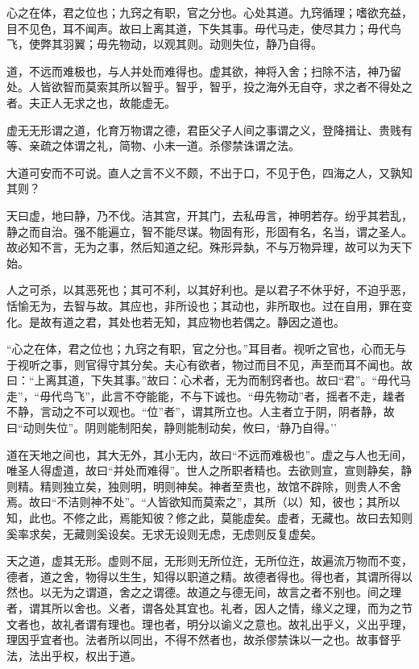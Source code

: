 \documentclass[]{article}
\begin{document}
心之在体，君之位也；九窍之有职，官之分也。心处其道。九窍循理；嗜欲充益，目不见色，耳不闻声。故曰上离其道，下失其事。毋代马走，使尽其力；毋代鸟飞，使弊其羽翼；毋先物动，以观其则。动则失位，静乃自得。

道，不远而难极也，与人并处而难得也。虚其欲，神将入舍；扫除不洁，神乃留处。人皆欲智而莫索其所以智乎。智乎，智乎，投之海外无自夺，求之者不得处之者。夫正人无求之也，故能虚无。

虚无无形谓之道，化育万物谓之德，君臣父子人间之事谓之义，登降揖让、贵贱有等、亲疏之体谓之礼，简物、小未一道。杀僇禁诛谓之法。

大道可安而不可说。直人之言不义不颇，不出于口，不见于色，四海之人，又孰知其则？

天曰虚，地曰静，乃不伐。洁其宫，开其门，去私毋言，神明若存。纷乎其若乱，静之而自治。强不能遍立，智不能尽谋。物固有形，形固有名，名当，谓之圣人。故必知不言，无为之事，然后知道之纪。殊形异埶，不与万物异理，故可以为天下始。

人之可杀，以其恶死也；其可不利，以其好利也。是以君子不休乎好，不迫乎恶，恬愉无为，去智与故。其应也，非所设也；其动也，非所取也。过在自用，罪在变化。是故有道之君，其处也若无知，其应物也若偶之。静因之道也。

``心之在体，君之位也；九窍之有职，官之分也。''耳目者。视听之官也，心而无与于视听之事，则官得守其分矣。夫心有欲者，物过而目不见，声至而耳不闻也。故曰：``上离其道，下失其事。''故曰：心术者，无为而制窍者也。故曰``君''。``毋代马走''，``毋代鸟飞''，此言不夺能能，不与下诚也。``毋先物动''者，摇者不走，趮者不静，言动之不可以观也。``位''者''，谓其所立也。人主者立于阴，阴者静，故曰``动则失位''。阴则能制阳矣，静则能制动矣，攸曰，`静乃自得。''

道在天地之间也，其大无外，其小无内，故曰``不远而难极也''。虚之与人也无间，唯圣人得虚道，故曰``并处而难得''。世人之所职者精也。去欲则宣，宣则静矣，静则精。精则独立矣，独则明，明则神矣。神者至贵也，故馆不辟除，则贵人不舍焉。故曰``不洁则神不处''。``人皆欲知而莫索之''，其所（以）知，彼也；其所以知，此也。不修之此，焉能知彼？修之此，莫能虚矣。虚者，无藏也。故曰去知则奚率求矣，无藏则奚设矣。无求无设则无虑，无虑则反复虚矣。

天之道，虚其无形。虚则不屈，无形则无所位迕，无所位迕，故遍流万物而不变，德者，道之舍，物得以生生，知得以职道之精。故德者得也。得也者，其谓所得以然也。以无为之谓道，舍之之谓德。故道之与德无间，故言之者不别也。间之理者，谓其所以舍也。义者，谓各处其宜也。礼者，因人之情，缘义之理，而为之节文者也，故礼者谓有理也。理也者，明分以谕义之意也。故礼出乎义，义出乎理，理因乎宜者也。法者所以同出，不得不然者也，故杀僇禁诛以一之也。故事督乎法，法出乎权，权出于道。
\end{document}
